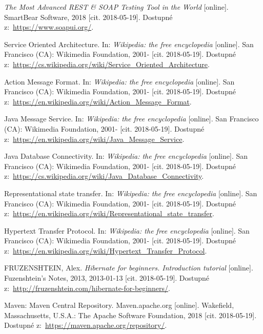 \documentclass[a4paper,12pt]{article}
\begin{document}
{  \textit{The Most Advanced REST \& SOAP Testing Tool in the World} [online]. SmartBear Software, 2018 [cit. 2018-05-19]. Dostupné z:~\url{https://www.soapui.org/}.
 
  Service Oriented Architecture. In: \textit{Wikipedia: the free encyclopedia} [online]. San Francisco (CA): Wikimedia Foundation, 2001- [cit. 2018-05-19]. Dostupné z:~\url{https://cs.wikipedia.org/wiki/Service_Oriented_Architecture}.
  
  Action Message Format. In: \textit{Wikipedia: the free encyclopedia} [online]. San Francisco (CA): Wikimedia Foundation, 2001- [cit. 2018-05-19]. Dostupné z:~\url{https://en.wikipedia.org/wiki/Action_Message_Format}.
  
  Java Message Service. In: \textit{Wikipedia: the free encyclopedia} [online]. San Francisco (CA): Wikimedia Foundation, 2001- [cit. 2018-05-19]. Dostupné z:~\url{https://en.wikipedia.org/wiki/Java_Message_Service}.
  
  Java Database Connectivity. In: \textit{Wikipedia: the free encyclopedia} [online]. San Francisco (CA): Wikimedia Foundation, 2001- [cit. 2018-05-19]. Dostupné z:~\url{https://cs.wikipedia.org/wiki/Java_Database_Connectivity}.
  
  Representational state transfer. In: \textit{Wikipedia: the free encyclopedia} [online]. San Francisco (CA): Wikimedia Foundation, 2001- [cit. 2018-05-19]. Dostupné z:~\url{https://en.wikipedia.org/wiki/Representational_state_transfer}.
  
  Hypertext Transfer Protocol. In: \textit{Wikipedia: the free encyclopedia} [online]. San Francisco (CA): Wikimedia Foundation, 2001- [cit. 2018-05-19]. Dostupné z:~\url{https://en.wikipedia.org/wiki/Hypertext_Transfer_Protocol}.
  
  FRUZENSHTEIN, Alex. \textit{Hibernate for beginners. Introduction tutorial} [online]. Fuzenshtein's Notes, 2013, 2013-01-13 [cit. 2018-05-19]. Dostupné z:~\url{http://fruzenshtein.com/hibernate-for-beginners/}.
  
  Maven: Maven Central Repository. Maven.apache.org [online]. Wakefield, Massachusetts, U.S.A.: The Apache Software Foundation, 2018 [cit. 2018-05-19]. Dostupné z:~\url{https://maven.apache.org/repository/}.
  
}

\end{document}
